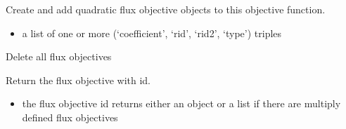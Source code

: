 \documentclass[letterpaper,10pt,english]{sphinxmanual}
\begin{document}
\begin{fulllineitems}

\begin{fulllineitems}
\label{\detokenize{modules_doc:cbmpy.CBModel.Objective.createQuadraticFluxObjectives}}
\pysigstartsignatures
{}
\pysigstopsignatures
\sphinxAtStartPar
Create and add quadratic flux objective objects to this objective function.
\begin{itemize}
\item {} 
\sphinxAtStartPar
{} a list of one or more (‘coefficient’, ‘rid’, ‘rid2’, ‘type’) triples

\end{itemize}

\end{fulllineitems}


\begin{fulllineitems}
\label{\detokenize{modules_doc:cbmpy.CBModel.Objective.deleteAllFluxObjectives}}
\pysigstartsignatures
{}
\pysigstopsignatures
\sphinxAtStartPar
Delete all flux objectives

\end{fulllineitems}


\begin{fulllineitems}
\label{\detokenize{modules_doc:cbmpy.CBModel.Objective.getFluxObjective}}
\pysigstartsignatures
{}
\pysigstopsignatures
\sphinxAtStartPar
Return the flux objective with id.
\begin{itemize}
\item {} 
\sphinxAtStartPar
{} the flux objective id returns either an object or a list if there are multiply defined flux objectives

\end{itemize}

\end{fulllineitems}


\end{fulllineitems}
\end{document}
